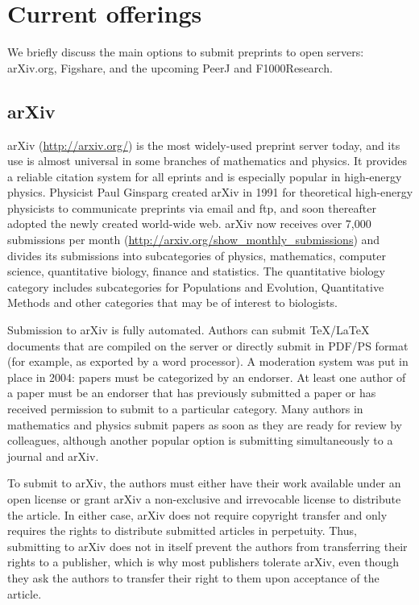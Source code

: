 \documentclass[letterpaper,twocolumn,superscriptaddress,showkeys]{revtex4-1}
\begin{document}
\section{Current offerings}

We briefly discuss the main options to submit preprints to open servers:
arXiv.org, Figshare, and the upcoming PeerJ and F1000Research.

\subsection{arXiv}

arXiv (\url{http://arxiv.org/}) is the most widely-used preprint server today,
and its use is almost universal in some branches of mathematics and physics.  It
provides a reliable citation system for all eprints and is especially popular in
high-energy physics. Physicist Paul Ginsparg created arXiv in 1991 for
theoretical high-energy physicists to communicate preprints via email and ftp,
and soon thereafter adopted the newly created world-wide
web\cite{jackson2002preprints}.  arXiv now receives over 7,000 submissions per
month (\url{http://arxiv.org/show_monthly_submissions}) and divides its
submissions into subcategories of physics, mathematics, computer science,
quantitative biology, finance and statistics.  The quantitative biology category
includes subcategories for Populations and Evolution, Quantitative Methods and
other categories that may be of interest to biologists.

Submission to arXiv is fully automated.  Authors can submit \TeX/\LaTeX
documents that are compiled on the server or directly submit in PDF/PS format
(for example, as exported by a word processor).  A moderation system was put in
place in 2004: papers must be categorized by an endorser. At least one
author of a paper must be an endorser that has previously submitted a paper or
has received permission to submit to a particular category.  Many authors in
mathematics and physics submit papers as soon as they are ready for review by
colleagues, although another popular option is submitting simultaneously to a
journal and arXiv.

To submit to arXiv, the authors must either have their work available under an
open license or grant arXiv a non-exclusive and irrevocable license to
distribute the article. In either case, arXiv does not require copyright
transfer and only requires the rights to distribute submitted articles in
perpetuity. Thus, submitting to arXiv does not in itself prevent the authors
from transferring their rights to a publisher, which is why most publishers
tolerate arXiv, even though they ask the authors to transfer their right to them
upon acceptance of the article. 
\end{document}
